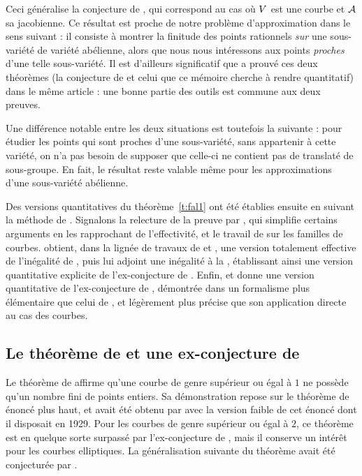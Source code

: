 Ceci généralise la conjecture de , qui correspond au cas où \(
  V \) est une courbe et \( \mathcal A \) sa jacobienne. Ce résultat est proche
de notre problème d'approximation dans le sens suivant : il consiste à montrer
la finitude des points rationnels \emph{sur} une sous-variété de variété
abélienne, alors que nous nous intéressons aux points \emph{proches} d'une
telle sous-variété. Il est d'ailleurs significatif que  a prouvé
ces deux théorèmes (la conjecture de  et celui que ce
mémoire cherche à rendre quantitatif) dans le même article : une bonne partie
des outils est commune aux deux preuves.

Une différence notable entre les deux situations est toutefois la suivante :
pour étudier les points qui sont proches d'une sous-variété, sans appartenir
à cette variété, on n'a pas besoin de supposer que celle-ci ne contient pas de
translaté de sous-groupe. En fait, le résultat reste valable même pour les
approximations d'une sous-variété abélienne.

Des versions quantitatives du théorème~\vref{t:fal1} ont été établies ensuite
en suivant la méthode de .  Signalons la relecture de la preuve par
 \cite{bommcr}, qui simplifie certains arguments en les
rapprochant de l'effectivité, et le travail de  \cite{ddprf} sur
les familles de courbes.  obtient, dans la lignée de travaux de
 et , une version totalement effective de
l'inégalité de  \cite{remivds}, puis lui adjoint une inégalité à la
, établissant ainsi une version quantitative explicite
\cite{remdcl} de l'ex-conjecture de . Enfin, 
\cite[chap.~3]{farhith} et \cite{faraptf} donne une version quantitative de
l'ex-conjecture de , démontrée dans un formalisme plus élémentaire
que celui de , et légèrement plus précise que son application
directe au cas des courbes.


\subsection{Le théorème de  et une ex-conjecture de }
\label{s:siegel}

Le théorème de  \cite{siegel} affirme qu'une courbe de genre
supérieur ou égal à \( 1 \) ne possède qu'un nombre fini de points entiers. Sa
démonstration repose sur le théorème de  énoncé plus haut, et avait
été obtenu par  avec la version faible de cet énoncé dont il
disposait en 1929. Pour les courbes de genre supérieur ou égal à \( 2 \), ce
théorème est en quelque sorte surpassé par l'ex-conjecture de ,
mais il conserve un intérêt pour les courbes elliptiques. La généralisation
suivante du théorème avait été conjecturée par  \cite{laipc}.

